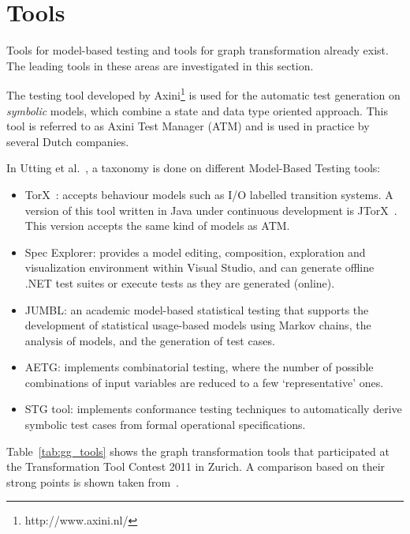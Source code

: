 \section{Tools}
Tools for model-based testing and tools for graph transformation already exist. The leading tools in these areas are investigated in this section.

The testing tool developed by Axini\footnote{http://www.axini.nl/} is used for the automatic test generation on \textit{symbolic} models, which combine a state and data type oriented approach. This tool is referred to as Axini Test Manager (ATM) and is used in practice by several Dutch companies.

In Utting et al.~\cite{Utting:MBTTaxonomy}, a taxonomy is done on different Model-Based Testing tools:
\begin{itemize}
  \item TorX~\cite{Tretmans:TorX}: accepts behaviour models such as I/O labelled transition systems. A version of this tool written in Java under continuous development is JTorX~\cite{Belinfante:JTorX}. This version accepts the same kind of models as ATM.
  \item Spec Explorer\cite{Veanes:SpecExplorer}: provides a model editing, composition, exploration and visualization environment within Visual Studio, and can generate offline .NET test suites or execute tests as they are generated (online).
  \item JUMBL\cite{Prowell:JUMBL}: an academic model-based statistical testing that supports the development of statistical usage-based models using Markov chains, the analysis of models, and the generation of test cases.
  \item AETG\cite{Cohen:AETG}: implements combinatorial testing, where the number of possible combinations of input variables are reduced to a few `representative' ones.
  \item STG tool\cite{clarke:STG}: implements conformance testing techniques to automatically derive symbolic test cases from formal operational specifications.
\end{itemize}

Table~\ref{tab:gg_tools} shows the graph transformation tools that participated at the Transformation Tool Contest 2011 in Zurich\cite{DBLP:gg_tools}. A comparison based on their strong points is shown taken from~\cite{TTC:contest}.


